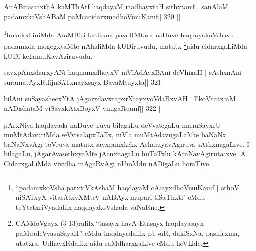 \begin{shl}
AnABitasatxthA kaMThAtf haqdayaM madhayxtaH sithxtamf |
sanAlaM padamxkoVshABaM paMcacidarxmadhoVmuKamf\hfill || 320 ||
\end{shl}

\begin{artha}
\footnote[1]{``padamxkoVsha parxtiVkAshaM haqdayaM cAsayxdhoVmuKamf | 
athoV niSATxyX vitasAtxyXMteV nABAyx mupari tiSaThxti" eMdu 
teYtatxriVyadalilx haqdayakoVshada vaNaRne.}hokakxLiniMda 
AraMBisi katitxna payaRMtara naDuve haqdayakoVshavu padamxda 
mogegxyaMte nAladiMda kUDiruvudu, matutx \footnote[2]{CAMdoVgayx 
(3-13)ralilx ``tasayx havA Etasayx haqdayasayx paMcadeVvasuSayaH'' eMdu 
haqdayadalilx pUvaR, dakiSxNa, pashicxma, utatxra, UdhavxRdalilx aidu 
raMdharxgaLive eMdu heVLide.}aidu cidarxgaLiMda kUDi keLamuKavAgiruvudu.
\end{artha}

\begin{shl}
\footnotemark[3]savxpAnxsharxyANi haqnamxdheyxV niVlAdAyxBAni deVhinaH |
sAthxnAni suramatAyxRdijuSATxnayxsayx BavaMtuyxta\hfill || 321 ||
\end{shl}

\begin{shl}
bilAni suSayashecxYtA jAgarxdavxtapxrXtayxyoVdaBxvAH |
EkoVtatxraM nADishataM viSavxkAtxBoyxV vinigaRtamf\hfill || 322 ||
\end{shl}

\begin{artha}
pArxNiya haqdayada naDuve iruva bilagaLu deVvategaLu manuSayxrU  muMtAdavariMda seVvisalapxTaTx, niVla muMtAdavugaLaMte baNaNx  baNaNxvAgi toVruva matutx savxpanxkekx AsharxyavAgiruva sAthxnagaLive.  I bilagaLu, jAgarAvasethxyaMte jAcnxnagaLu huTaTxlu kAraNavAgirutatxve. A CidarxgaLiMda vividha mAgaRvAgi nUroMdu nADigaLu horaTive.
\end{artha}

